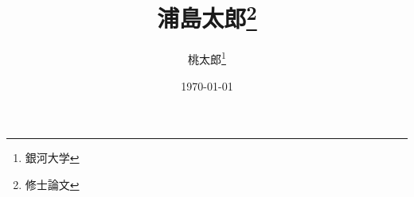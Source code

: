 \documentclass[a4paper,uplatex]{jsreport}
\begin{document}
\title{浦島太郎\thanks{修士論文}}
\author{桃太郎\thanks{銀河大学}}

\date{\today} %
\maketitle
\tableofcontents
\listoffigures
\listoftables




%
%
\end{document}
